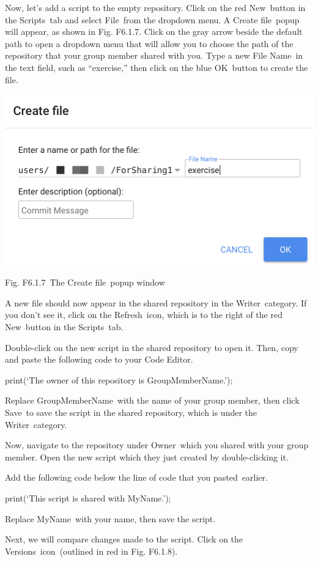 \documentclass[
  letterpaper,
  DIV=11,
  numbers=noendperiod]{scrreprt}
\begin{document}
Now, let's add a script to the empty repository. Click on the red
New~button in the Scripts~tab and select File~from the dropdown menu. A
Create file~popup will appear, as shown in Fig. F6.1.7. Click on the
gray arrow beside the default path to open a dropdown menu that will
allow you to choose the path of the repository that your group member
shared with you. Type a new File Name~in the text field, such as
``exercise,'' then click on the blue OK~button to create the file.

\includegraphics{./F6/image69.png}

Fig. F6.1.7~The Create file~popup window

A new file should now appear in the shared repository in the
Writer~category. If you don't see it, click on the Refresh~icon, which
is to the right of the red New~button in the Scripts~tab.

Double-click on the new script in the shared repository to open it.
Then, copy and paste the following code to your Code Editor.

print(`The owner of this repository is GroupMemberName.');

Replace GroupMemberName~with the name of your group member, then click
Save~to save the script in the shared repository, which is under the
Writer~category.

Now, navigate to the repository under Owner~which you shared with your
group member. Open the new script which they just created by
double-clicking it.

Add the following code below the line of code that you pasted~earlier.

print(`This script is shared with MyName.');

Replace MyName~with your name, then save the script.

Next, we will compare changes made to the script. Click on the
Versions~icon~(outlined in red in Fig. F6.1.8).
\end{document}
